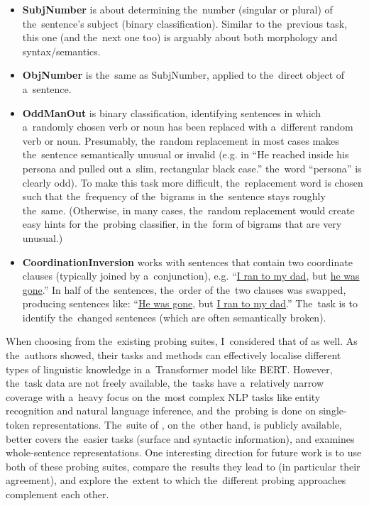 \documentclass[bsc,frontabs,singlespacing,parskip,deptreport]{infthesis}
\begin{document}
{{\begin{enumerate}
{\begin{itemize}
          \item \textbf{SubjNumber} is about determining the~number (singular or plural) of the~sentence's subject (binary classification). Similar to the~previous task, this one (and the~next one too) is arguably about both morphology and syntax/semantics.
          \item \textbf{ObjNumber} is the~same as SubjNumber, applied to the~direct object of a~sentence.
          \item \textbf{OddManOut} is binary classification, identifying sentences in which a~randomly chosen verb or noun has been replaced with a~different random verb or noun. Presumably, the~random replacement in most cases makes the~sentence semantically unusual or invalid (e.g. in ``He reached inside his persona and pulled out a~slim, rectangular black case.'' the~word ``persona'' is clearly odd). To make this task more difficult, the~replacement word is chosen such that the~frequency of the~bigrams in the~sentence stays roughly the~same. (Otherwise, in many cases, the~random replacement would create easy hints for the~probing classifier, in the~form of bigrams that are very unusual.)
          \item \textbf{CoordinationInversion} works with sentences that contain two coordinate clauses (typically joined by a~conjunction), e.g. ``\underline{I ran to my dad}, but \underline{he was gone}.'' In half of the~sentences, the~order of the~two clauses was swapped, producing sentences like: ``\underline{He was gone}, but \underline{I ran to my dad}.'' The~task is to identify the~changed sentences (which are often semantically broken).
        \end{itemize}
      }
    \end{enumerate}

    When choosing from the~existing probing suites, I~considered that of \citet{Tenney_2019b} as well. As the~authors showed, their tasks and methods can effectively localise different types of linguistic knowledge in a~Transformer model like BERT.
    However, the~task data are not freely available, the~tasks have a~relatively narrow coverage with a~heavy focus on the~most complex NLP tasks like entity recognition and natural language inference, and the~probing is done on single-token representations.
    The~suite of \citeauthor{Conneau_2018}, on the~other hand, is publicly available, better covers the~easier tasks (surface and syntactic information), and examines whole-sentence representations.
    One interesting direction for future work is to use both of these probing suites, compare the~results they lead to (in particular their agreement), and explore the~extent to which the~different probing approaches complement each other.
  }

}
\end{document}
